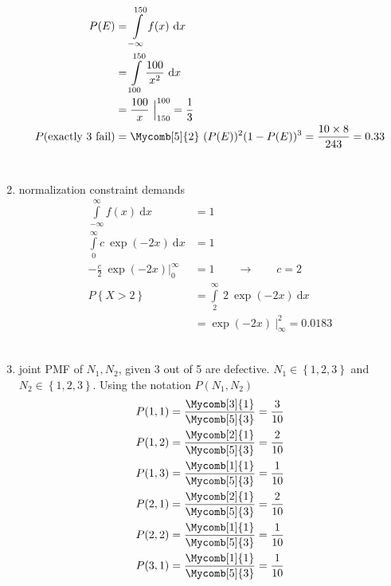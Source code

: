 \begin{enumerate}
		\begin{align}
			P(E) &= \int\limits_{-\infty}^{150} f(x) \ \mathrm{d}x \nonumber\\
			&= \int\limits_{100}^{150} \frac{100}{x^2} \ \mathrm{d}x \nonumber\\
			&= \frac{100}{x}\ \Big|_{150}^{100} = \frac{1}{3} \\
			P(\text{exactly 3 fail}) &= \Mycomb[5]{2} \ (P(E))^2 (1 - P(E))^3 = \frac{10 \times 8}{243} = 0.33
		\end{align}\\
	
	
	\item normalization constraint demands \\
	
		\begin{align}
			\int\limits_{-\infty}^{\infty} f(x)\ \mathrm{d}x &= 1 \nonumber \\
			\int\limits_{0}^{\infty} c \ \exp(-2x)\ \mathrm{d}x &= 1 \nonumber\\
			-\frac{c}{2} \ \exp(-2x) \Big|_0^\infty &= 1 \qquad \to \qquad c = 2 \\
			P \left\{X > 2 \right\} &= \int\limits_{2}^{\infty}\ 2\ \exp(-2x)\ \mathrm{d}x \nonumber \\
			&= \exp(-2x)\ \Big|_{\infty}^{2} = 0.0183
		\end{align}\\
	
	
	\item joint PMF of $ N_1, N_2 $, given 3 out of 5 are defective. $ N_1 \in \left\{1, 2, 3\right\} $ and $ N_2 \in \left\{ 1, 2, 3 \right\} $. Using the notation $ P(N_1, N_2) $\\
	
	\begin{align}
		P(1, 1) = \frac{\Mycomb[3]{1}}{\Mycomb[5]{3}} = \frac{3}{10} \nonumber \\
		P(1, 2) = \frac{\Mycomb[2]{1}}{\Mycomb[5]{3}} = \frac{2}{10} \nonumber \\
		P(1, 3) = \frac{\Mycomb[1]{1}}{\Mycomb[5]{3}} = \frac{1}{10} \nonumber \\
		P(2, 1) = \frac{\Mycomb[2]{1}}{\Mycomb[5]{3}} = \frac{2}{10} \nonumber \\
		P(2, 2) = \frac{\Mycomb[1]{1}}{\Mycomb[5]{3}} = \frac{1}{10} \nonumber \\
		P(3, 1) = \frac{\Mycomb[1]{1}}{\Mycomb[5]{3}} = \frac{1}{10} \nonumber \\
	\end{align} \\
	

\end{enumerate}
